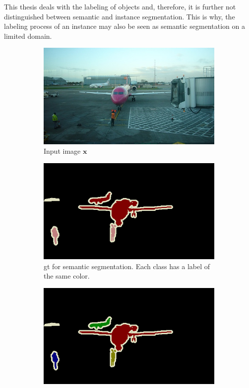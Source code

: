 This thesis deals with the labeling of objects and, therefore, it is further not distinguished between semantic and instance segmentation.
This is why, the labeling process of an instance may also be seen as semantic segmentation on a limited domain.
\begin{figure} [h]
	\centering
	\begin{subfigure}[t]{0.3\textwidth}
		\centering
		\includegraphics[width=\textwidth]{figures/chap22_image.jpg}
		\caption{
			Input image $\textbf{x}$
		}\label{fig:ch2:sec2:image}
	\end{subfigure}
	\hfill
	\begin{subfigure}[t]{0.3\textwidth}
		\centering
		\includegraphics[width=\textwidth]{figures/chap22_semantic_seg.png}
		\caption{
			\gls{gt} for semantic segmentation.
			Each class has a label of the same color.
		} \label{fig:ch2:sec2:semantic_seg}
	\end{subfigure}
	\hfill
	\begin{subfigure}[t]{0.3\textwidth}
		\centering
		\includegraphics[width=\textwidth]{figures/chap22_instance_seg.png}

\end{subfigure}
\end{figure}
